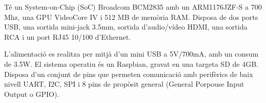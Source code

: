 \documentclass[twoside]{article}
\begin{document}

Té un System-on-Chip (SoC) Broadcom BCM2835 amb un ARM1176JZF-S a 700 Mhz, una GPU VideoCore IV i 512 MB de memòria RAM. Disposa de dos ports USB, una sortida mini-jack 3.5mm, sortida d'audio/vídeo HDMI, una sortida RCA i un port RJ45 10/100 d'Ethernet. 

L'alimentació es realitza per mitjà d'un mini USB a 5V/700mA, amb un consum de 3.5W. El sistema operatiu és un Raspbian, gravat en una targeta SD de 4GB. Disposa d'un conjunt de pins que permeten comunicació amb perifèrics de baix nivell UART, I2C, SPI i 8 pins de propòsit general (General Porpouse Input Output o GPIO).
\end{document}
